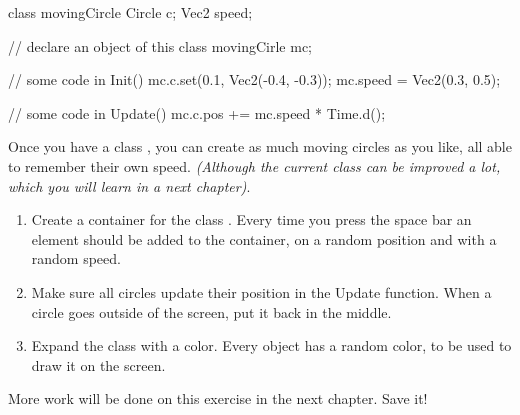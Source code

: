 \begin{code}
class movingCircle {
  Circle c;
  Vec2 speed;
}

// declare an object of this class
movingCirle mc;

// some code in Init()
mc.c.set(0.1, Vec2(-0.4, -0.3));
mc.speed = Vec2(0.3, 0.5);

// some code in Update()
mc.c.pos += mc.speed * Time.d();
\end{code}

Once you have a class , you can create as much moving circles as you like, all able to remember their own speed. \textit{(Although the current class can be improved a lot, which you will learn in a next chapter)}.

\begin{exercise}
\begin{enumerate}
  \item Create a container for the class . Every time you press the space bar an element should be added to the container, on a random position and with a random speed.
	\item Make sure all circles update their position in the Update function. When a circle goes outside of the screen, put it back in the middle.
	\item Expand the class  with a color. Every object has a random color, to be used to draw it on the screen.
	\end{enumerate}
\end{exercise}

\begin{note}
More work will be done on this exercise in the next chapter. Save it!
\end{note}
